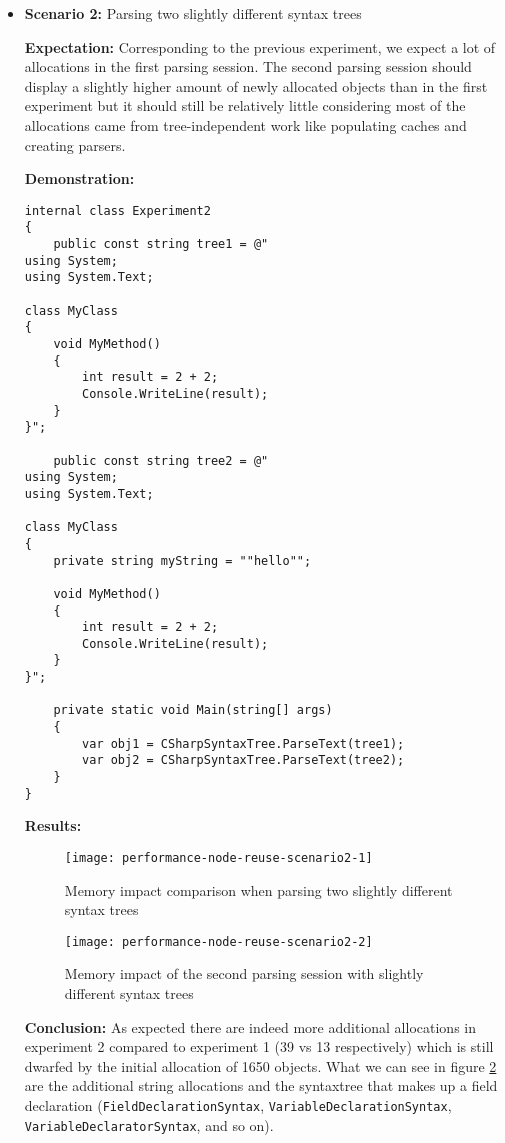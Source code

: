 \begin{itemize}
\item \textbf{Scenario 2:} Parsing two slightly different syntax trees

\textbf{Expectation:} Corresponding to the previous experiment, we expect a lot of allocations in the first parsing session. The second parsing session should display a slightly higher amount of newly allocated objects than in the first experiment but it should still be relatively little considering most of the allocations came from tree-independent work like populating caches and creating parsers.

\textbf{Demonstration:} 

\begin{lstlisting}
internal class Experiment2
{
	public const string tree1 = @"
using System;
using System.Text;

class MyClass 
{
    void MyMethod()
    {
        int result = 2 + 2;
        Console.WriteLine(result);
    }
}";

	public const string tree2 = @"
using System;
using System.Text;

class MyClass 
{
    private string myString = ""hello"";

    void MyMethod()
    {
        int result = 2 + 2;
        Console.WriteLine(result);
    }
}";

	private static void Main(string[] args)
	{
		var obj1 = CSharpSyntaxTree.ParseText(tree1);
		var obj2 = CSharpSyntaxTree.ParseText(tree2);
	}
}
\end{lstlisting}

\textbf{Results:}

\begin{figure}[H]
\centering
\texttt{[image: performance-node-reuse-scenario2-1]}
\caption{Memory impact comparison when parsing two slightly different syntax trees}
\label{img:performance-node-reuse-scenario2-1}
\end{figure}

\begin{figure}[H]
\centering
\texttt{[image: performance-node-reuse-scenario2-2]}
\caption{Memory impact of the second parsing session with slightly different syntax trees}
\label{img:performance-node-reuse-scenario2-2}
\end{figure}

\textbf{Conclusion:} As expected there are indeed more additional allocations in experiment 2 compared to experiment 1 (39 vs 13 respectively) which is still dwarfed by the initial allocation of 1650 objects. What we can see in figure \ref{img:performance-node-reuse-scenario2-2} are the additional string allocations and the \gls{syntaxtree} that makes up a field declaration (\texttt{FieldDeclarationSyntax}, \texttt{VariableDeclarationSyntax}, \texttt{VariableDeclaratorSyntax}, and so on).


\end{itemize}
